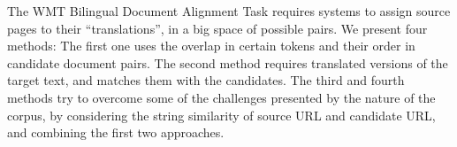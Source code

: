 The WMT Bilingual Document Alignment Task requires systems to assign source pages to their ``translations'', in a big space of possible pairs. We present four methods: The first one uses the overlap in certain tokens and their order in candidate document pairs. The second method requires translated versions of the target text, and matches them with the candidates. The third and fourth methods try to overcome some of the challenges presented by the nature of the corpus, by considering the string similarity of source URL and candidate URL, and combining the first two approaches.
